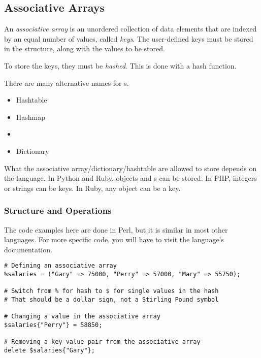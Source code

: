 \subsection{Associative Arrays}\label{subsec:Associative_Arrays}
\begin{definition}\label{def:Associative_Array}
  An \emph{associative array} is an unordered collection of data elements that are indexed by an equal number of values, called \emph{keys}.
  The user-defined keys must be stored in the structure, along with the values to be stored.

  To store the keys, they must be \emph{hashed}.
  This is done with a hash function.

  \begin{remark}
    There are many alternative names for s.
    \begin{itemize}[noitemsep]
    \item Hashtable
    \item Hashmap
    \item {}
    \item Dictionary
    \end{itemize}
  \end{remark}

  \begin{remark}
    What the associative array/dictionary/hashtable are allowed to store depends on the language.
    In Python and Ruby, objects and s can be stored.
    In PHP, integers or strings can be keys.
    In Ruby, any object can be a key.
  \end{remark}
\end{definition}

\subsubsection{Structure and Operations}\label{subsubsec:Structure_and_Ops_Associative_Arrays}
The code examples here are done in Perl, but it is similar in most other languages.
For more specific code, you will have to visit the language's documentation.
\begin{verbatim}
# Defining an associative array
%salaries = ("Gary" => 75000, "Perry" => 57000, "Mary" => 55750);

# Switch from % for hash to $ for single values in the hash
# That should be a dollar sign, not a Stirling Pound symbol

# Changing a value in the associative array
$salaries{"Perry"} = 58850;

# Removing a key-value pair from the associative array
delete $salaries{"Gary"};
\end{verbatim}

